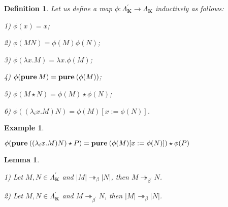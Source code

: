 \documentclass[a4paper]{article}
\newtheorem{lemma}{Lemma}
\newtheorem{defin}{Definition}
\newtheorem{ex}{Example}
\begin{document}
\begin{defin} Let us define a map $\phi : \Lambda^{'}_{\textbf{K}} \to \Lambda_{\textbf{K}}$ inductively as
follows:

1) $\phi(x) = x$;

2) $\phi(M N) = \phi(M)\phi(N)$;

3) $\phi(\lambda x. M) = \lambda x. \phi(M)$;

4) $\phi({\bf pure \: } M) = {\bf pure \: } (\phi(M))$;

5) $\phi(M \star N) = \phi(M) \star \phi(N)$;

6) $\phi((\lambda_i x. M) N) = \phi(M) [x := \phi(N)]$.

\end{defin}

\begin{ex}

$ $

$\phi({\bf pure \: } ((\lambda_i x. M) N) \star P) = {\bf pure \: } (\phi(M) [x := \phi(N)]) \star \phi(P)$

\end{ex}

\begin{lemma}

$ $

1) Let $M, N \in \Lambda^{'}_{\textbf{K}}$ and $|M| \twoheadrightarrow_{\beta} |N|$, then $M \twoheadrightarrow_{\beta^{'}} N$.

2) Let $M, N \in \Lambda^{'}_{\textbf{K}}$ and $M \twoheadrightarrow_{\beta^{'}} N$, then $|M| \twoheadrightarrow_{\beta} |N|$.

\end{lemma}
\end{document}
